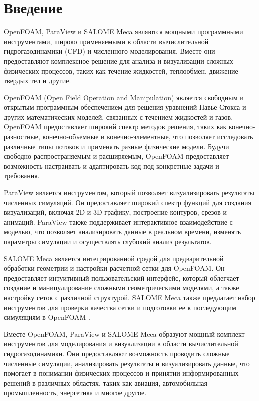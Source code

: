 \documentclass[a4paper,12pt]{article}
\theoremstyle{plain} %
\theoremstyle{definition} %
\theoremstyle{remark} %
\begin{document}
\newpage 
\tableofcontents
\setcounter{page}{3}

\newpage
\section{Введение}


OpenFOAM, ParaView и SALOME Meca являются мощными программными инструментами, широко применяемыми в области вычислительной гидрогазодинамики (CFD) и численного моделирования. Вместе они предоставляют комплексное решение для анализа и визуализации сложных физических процессов, таких как течение жидкостей, теплообмен, движение твердых тел и другие.

OpenFOAM (Open Field Operation and Manipulation) является свободным и открытым программным обеспечением для решения уравнений Навье-Стокса и других математических моделей, связанных с течением жидкостей и газов. OpenFOAM предоставляет широкий спектр методов решения, таких как конечно-разностные, конечно-объемные и конечно-элементные, что позволяет исследовать различные типы потоков и применять разные физические модели. Будучи свободно распространяемым и расширяемым, OpenFOAM предоставляет возможность настраивать и адаптировать код под конкретные задачи и требования.

ParaView является инструментом, который позволяет визуализировать результаты численных симуляций. Он предоставляет широкий спектр функций для создания визуализаций, включая 2D и 3D графику, построение контуров, срезов и анимаций. ParaView также поддерживает интерактивное взаимодействие с моделью, что позволяет анализировать данные в реальном времени, изменять параметры симуляции и осуществлять глубокий анализ результатов.

SALOME Meca является интегрированной средой для предварительной обработки геометрии и настройки расчетной сетки для OpenFOAM. Он предоставляет интуитивный пользовательский интерфейс, который облегчает создание и манипулирование сложными геометрическими моделями, а также настройку сеток с различной структурой. SALOME Meca также предлагает набор инструментов для проверки качества сетки и подготовки ее к последующим симуляциям в OpenFOAM \cite{wOfDocSalome}.

Вместе OpenFOAM, ParaView и SALOME Meca образуют мощный комплект инструментов для моделирования и визуализации в области вычислительной гидрогазодинамики. Они предоставляют возможность проводить сложные численные симуляции, анализировать результаты и визуализировать данные, что помогает в понимании физических процессов и принятии информированных решений в различных областях, таких как авиация, автомобильная промышленность, энергетика и многое другое.
\end{document}
